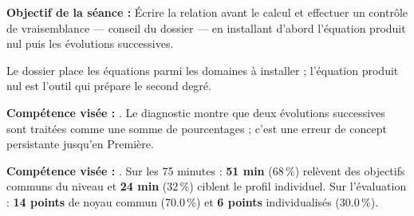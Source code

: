 \documentclass[10pt,a4paper]{article}
\begin{document}
\begin{goalbox}\textbf{Objectif de la séance :} Écrire la relation avant le calcul et effectuer un contrôle de vraisemblance — conseil du dossier — en installant d'abord l'équation produit nul puis les évolutions successives.\end{goalbox}
Le dossier place les équations parmi les domaines à installer ; l'équation produit nul est l'outil qui prépare le second degré.
\par\vspace{1mm}\textbf{Compétence visée :} .
Le diagnostic montre que deux évolutions successives sont traitées comme une somme de pourcentages ; c'est une erreur de concept persistante jusqu'en Première.
\par\vspace{1mm}\textbf{Compétence visée :} .
Sur les 75 minutes : \textbf{51 min} (68\,\%) relèvent des objectifs communs du niveau et \textbf{24 min} (32\,\%) ciblent le profil individuel. Sur l'évaluation : \textbf{14 points} de noyau commun (70.0\,\%) et \textbf{6 points} individualisés (30.0\,\%).
\newpage{}
\end{document}
